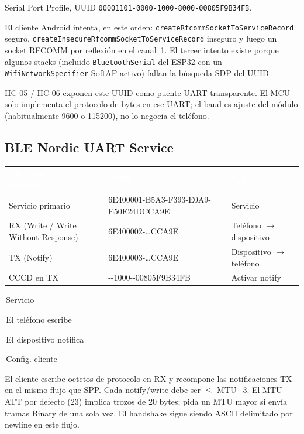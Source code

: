 \documentclass[12pt,a4paper]{article}
\newcommand{\thc}[1]{\textcolor{white}{\bfseries #1}}
\newcommand{\chip}[2]{\colorbox{#1}{\strut\,\scriptsize #2\,}}
\begin{document}
Serial Port Profile, UUID
\texttt{00001101-0000-1000-8000-00805F9B34FB}.

El cliente Android intenta, en este orden:
\texttt{createRfcommSocketToServiceRecord} seguro,
\texttt{createInsecureRfcommSocketToServiceRecord} inseguro y luego un
socket RFCOMM por reflexión en el canal~1.
El tercer intento existe porque algunos stacks (incluido
\texttt{BluetoothSerial} del ESP32 con un \texttt{WifiNetworkSpecifier}
SoftAP activo) fallan la búsqueda SDP del UUID.

HC-05 / HC-06 exponen este UUID como puente UART transparente.
El MCU solo implementa el protocolo de bytes en ese UART; el baud es
ajuste del módulo (habitualmente 9600 o 115200), no lo negocia el teléfono.

\subsection{BLE Nordic UART Service}

\begin{center}
\renewcommand{\arraystretch}{1.25}
\begin{tabular}{>{\raggedright\arraybackslash}p{4.4cm}
                >{\raggedright\arraybackslash}p{6.2cm}
                >{\centering\arraybackslash}p{2.7cm}}
\rowcolor{TblHead}
\thc{Atributo en el periférico} & \thc{UUID} & \thc{Rol} \\
\rowcolor{TblSync}
Servicio primario &
  {\small\ttfamily 6E400001-\allowbreak B5A3-F393-\allowbreak E0A9-\allowbreak E50E24DCCA9E} &
  Servicio \\
\rowcolor{TblChan}
RX (Write / Write Without Response) &
  {\small\ttfamily 6E400002-\ldots CCA9E} &
  Teléfono $\rightarrow$ dispositivo \\
\rowcolor{TblTelem}
TX (Notify) &
  {\small\ttfamily 6E400003-\ldots CCA9E} &
  Dispositivo $\rightarrow$ teléfono \\
\rowcolor{TblLen}
CCCD en TX &
  {\small\ttfamily 00002902-\allowbreak 0000-1000-\allowbreak 8000-\allowbreak 00805F9B34FB} &
  Activar notify \\
\end{tabular}

\vspace{0.4em}
\chip{TblSync}{Servicio}
\chip{TblChan}{El teléfono escribe}
\chip{TblTelem}{El dispositivo notifica}
\chip{TblLen}{Config. cliente}
\end{center}

El cliente escribe octetos de protocolo en RX y recompone las notificaciones
TX en el mismo flujo que SPP.
Cada notify/write debe ser $\le$ MTU$-3$.
El MTU ATT por defecto (23) implica trozos de 20 bytes; pida un MTU mayor
si envía tramas Binary de una sola vez.
El handshake sigue siendo ASCII delimitado por newline en este flujo.
\end{document}
